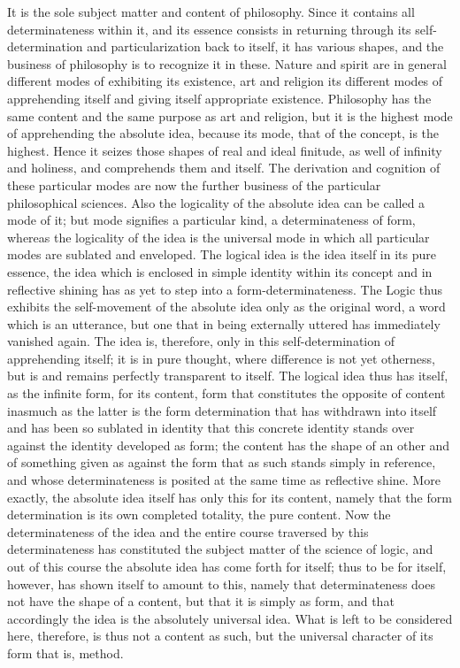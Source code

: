 It is the sole subject matter and content of philosophy.
Since it contains all determinateness within it,
and its essence consists in returning
through its self-determination
and particularization back to itself,
it has various shapes,
and the business of philosophy
is to recognize it in these.
Nature and spirit are in general
different modes of exhibiting its existence,
art and religion its different modes of apprehending itself
and giving itself appropriate existence.
Philosophy has the same content and the same
purpose as art and religion,
but it is the highest mode of apprehending the absolute idea,
because its mode, that of the concept, is the highest.
Hence it seizes those shapes
of real and ideal finitude,
as well of infinity and holiness,
and comprehends them and itself.
The derivation and cognition of these particular modes are
now the further business of the particular philosophical sciences.
Also the logicality of the absolute idea
can be called a mode of it;
but mode signifies a particular kind,
a determinateness of form,
whereas the logicality of the idea is
the universal mode in which
all particular modes are sublated and enveloped.
The logical idea is the idea itself in its pure essence,
the idea which is enclosed in
simple identity within its concept
and in reflective shining has as yet
to step into a form-determinateness.
The Logic thus exhibits the
self-movement of the absolute idea
only as the original word,
a word which is an utterance,
but one that in being externally uttered
has immediately vanished again.
The idea is, therefore, only in this
self-determination of apprehending itself;
it is in pure thought, where difference is not yet otherness,
but is and remains perfectly transparent to itself.
The logical idea thus has itself,
as the infinite form, for its content,
form that constitutes the opposite of content
inasmuch as the latter is the form determination
that has withdrawn into itself
and has been so sublated in identity
that this concrete identity stands over against
the identity developed as form;
the content has the shape of an other
and of something given as against the form
that as such stands simply in reference,
and whose determinateness is posited
at the same time as reflective shine.
More exactly, the absolute idea itself has
only this for its content,
namely that the form determination is
its own completed totality, the pure content.
Now the determinateness of the idea
and the entire course traversed by this determinateness
has constituted the subject matter of the science of logic,
and out of this course the absolute idea has come forth for itself;
thus to be for itself, however, has shown itself to amount to this,
namely that determinateness does not
have the shape of a content,
but that it is simply as form,
and that accordingly the idea is
the absolutely universal idea.
What is left to be considered here, therefore,
is thus not a content as such,
but the universal character of its form
that is, method.

